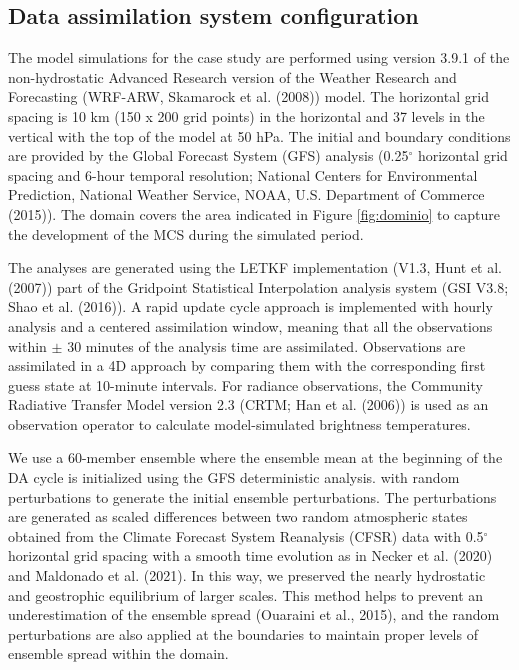 \documentclass[final,5p,times,twocolumn,authoryear]{elsarticle} %
\begin{document}
\hypertarget{config}{%
\subsection{Data assimilation system configuration}\label{config}}

The model simulations for the case study are performed using version 3.9.1 of the non-hydrostatic Advanced Research version of the Weather Research and Forecasting (WRF-ARW, Skamarock et al. (2008)) model.
The horizontal grid spacing is 10 km (150 x 200 grid points) in the horizontal and 37 levels in the vertical with the top of the model at 50 hPa.
The initial and boundary conditions are provided by the Global Forecast System (GFS) analysis (0.25\(^{\circ}\) horizontal grid spacing and 6-hour temporal resolution; National Centers for Environmental Prediction, National Weather Service, NOAA, U.S. Department of Commerce (2015)).
The domain covers the area indicated in Figure \ref{fig:dominio} to capture the development of the MCS during the simulated period.

The analyses are generated using the LETKF implementation (V1.3, Hunt et al. (2007)) part of the Gridpoint Statistical Interpolation analysis system (GSI V3.8; Shao et al. (2016)).
A rapid update cycle approach is implemented with hourly analysis and a centered assimilation window, meaning that all the observations within \(\pm\) 30 minutes of the analysis time are assimilated.
Observations are assimilated in a 4D approach by comparing them with the corresponding first guess state at 10-minute intervals.
For radiance observations, the Community Radiative Transfer Model version 2.3 (CRTM; Han et al. (2006)) is used as an observation operator to calculate model-simulated brightness temperatures.

We use a 60-member ensemble where the ensemble mean at the beginning of the DA cycle is initialized using the GFS deterministic analysis. with random perturbations to generate the initial ensemble perturbations. The perturbations are generated as scaled differences between two random atmospheric states obtained from the Climate Forecast System Reanalysis (CFSR) data with 0.5\(^{\circ}\) horizontal grid spacing with a smooth time evolution as in Necker et al. (2020) and Maldonado et al. (2021). In this way, we preserved the nearly hydrostatic and geostrophic equilibrium of larger scales. This method helps to prevent an underestimation of the ensemble spread (Ouaraini et al., 2015), and the random perturbations are also applied at the boundaries to maintain proper levels of ensemble spread within the domain.
\end{document}
